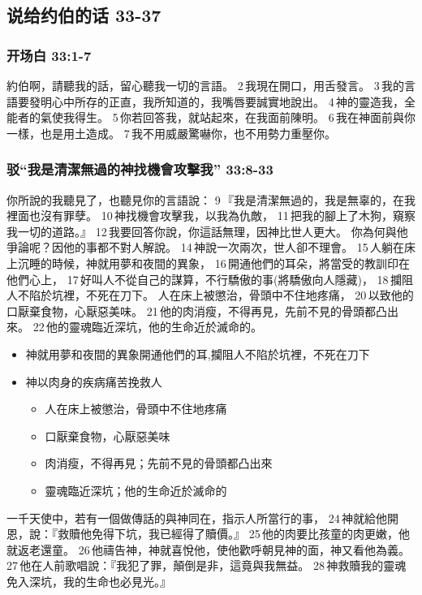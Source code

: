 \subsection{说给约伯的话 33-37}
\subsubsection{开场白 33:1-7}
約伯啊，請聽我的話，留心聽我一切的言語。 2 我現在開口，用舌發言。 3 我的言語要發明心中所存的正直，我所知道的，我嘴唇要誠實地說出。 4 神的靈造我，全能者的氣使我得生。 5 你若回答我，就站起來，在我面前陳明。 6 我在神面前與你一樣，也是用土造成。 7 我不用威嚴驚嚇你，也不用勢力重壓你。

\subsubsection{驳“我是清潔無過的神找機會攻擊我” 33:8-33}
你所說的我聽見了，也聽見你的言語說： 9 『我是清潔無過的，我是無辜的，在我裡面也沒有罪孽。 10 神找機會攻擊我，以我為仇敵， 11 把我的腳上了木狗，窺察我一切的道路。』 12 我要回答你說，你這話無理，因神比世人更大。
你為何與他爭論呢？因他的事都不對人解說。 14 神說一次兩次，世人卻不理會。 15 人躺在床上沉睡的時候，神就用夢和夜間的異象， 16 開通他們的耳朵，將當受的教訓印在他們心上， 17 好叫人不從自己的謀算，不行驕傲的事(將驕傲向人隱藏)， 18 攔阻人不陷於坑裡，不死在刀下。
人在床上被懲治，骨頭中不住地疼痛， 20 以致他的口厭棄食物，心厭惡美味。 21 他的肉消瘦，不得再見，先前不見的骨頭都凸出來。 22 他的靈魂臨近深坑，他的生命近於滅命的。
\begin{itemize}
\itemsep-.45em 
\item 神就用夢和夜間的異象開通他們的耳,攔阻人不陷於坑裡，不死在刀下
\item 神以肉身的疾病痛苦挽救人
\begin{itemize}
\itemsep-.45em 
\item 人在床上被懲治，骨頭中不住地疼痛
\item 口厭棄食物，心厭惡美味
\item 肉消瘦，不得再見；先前不見的骨頭都凸出來
\item 靈魂臨近深坑；他的生命近於滅命的
\end{itemize}
\end{itemize}

一千天使中，若有一個做傳話的與神同在，指示人所當行的事， 24 神就給他開恩，說：『救贖他免得下坑，我已經得了贖價。』 25 他的肉要比孩童的肉更嫩，他就返老還童。 26 他禱告神，神就喜悅他，使他歡呼朝見神的面，神又看他為義。 27 他在人前歌唱說：『我犯了罪，顛倒是非，這竟與我無益。 28 神救贖我的靈魂免入深坑，我的生命也必見光。』

